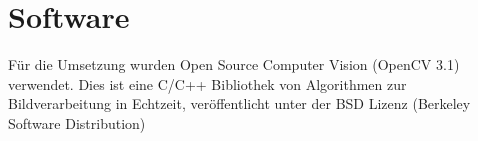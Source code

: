\section{Software}
Für die Umsetzung wurden Open Source Computer Vision (OpenCV 3.1) verwendet. Dies ist eine C/C++ Bibliothek von Algorithmen zur Bildverarbeitung in Echtzeit, veröffentlicht unter der BSD Lizenz (Berkeley
Software Distribution)\\
\cite{OpenCv_What_Is}\cite{wiki_Wha_is_OPenCV}
